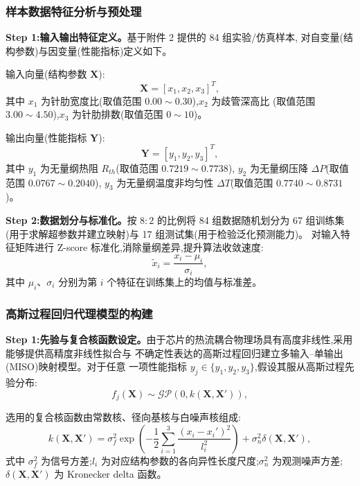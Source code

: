 \subsubsection{样本数据特征分析与预处理}

\textbf{Step 1:输入输出特征定义。}基于附件 2 提供的 84 组实验/仿真样本,
对自变量(结构参数)与因变量(性能指标)定义如下。

输入向量(结构参数 $\mathbf{X}$):
\begin{equation}
  \mathbf{X} = [x_1, x_2, x_3]^T,
  \label{eq:input-vector}
\end{equation}
其中 $x_1$ 为针肋宽度比(取值范围 $0.00 \sim 0.30$),$x_2$ 为歧管深高比
(取值范围 $3.00 \sim 4.50$),$x_3$ 为针肋排数(取值范围 $0 \sim 10$)。

输出向量(性能指标 $\mathbf{Y}$):
\begin{equation}
  \mathbf{Y} = [y_1, y_2, y_3]^T,
  \label{eq:output-vector}
\end{equation}
其中 $y_1$ 为无量纲热阻 $R_{th}$(取值范围 $0.7219 \sim 0.7738$),
$y_2$ 为无量纲压降 $\Delta P$(取值范围 $0.0767 \sim 0.2040$),
$y_3$ 为无量纲温度非均匀性 $\Delta T$(取值范围 $0.7740 \sim 0.8731$)。

\textbf{Step 2:数据划分与标准化。}按 $8:2$ 的比例将 84 组数据随机划分为 67 组训练集
(用于求解超参数并建立映射)与 17 组测试集(用于检验泛化预测能力)。
对输入特征矩阵进行 Z-score 标准化,消除量纲差异,提升算法收敛速度:
\begin{equation}
  \tilde{x}_i = \frac{x_i - \mu_i}{\sigma_i},
  \label{eq:standardize}
\end{equation}
其中 $\mu_i$、$\sigma_i$ 分别为第 $i$ 个特征在训练集上的均值与标准差。

\subsubsection{高斯过程回归代理模型的构建}

\textbf{Step 1:先验与复合核函数设定。}由于芯片的热流耦合物理场具有高度非线性,采用能够提供高精度非线性拟合与
不确定性表达的高斯过程回归\cite{Rasmussen2006}建立多输入--单输出(MISO)映射模型。对于任意
一项性能指标 $y_j \in \{y_1, y_2, y_3\}$,假设其服从高斯过程先验分布:
\begin{equation}
  f_j(\mathbf{X}) \sim \mathcal{GP}\left(0, k(\mathbf{X}, \mathbf{X}')\right),
  \label{eq:gp-prior}
\end{equation}

选用的复合核函数由常数核、径向基核与白噪声核组成:
\begin{equation}
  k(\mathbf{X}, \mathbf{X}') = \sigma_f^2 \exp\left( -\frac{1}{2}
  \sum_{i=1}^{3} \frac{(x_i - x_i')^2}{l_i^2} \right) + \sigma_n^2
  \delta(\mathbf{X}, \mathbf{X}'),
  \label{eq:kernel}
\end{equation}
式中 $\sigma_f^2$ 为信号方差;$l_i$ 为对应结构参数的各向异性长度尺度;$\sigma_n^2$ 为观测噪声方差;$\delta(\mathbf{X},
  \mathbf{X}')$ 为 Kronecker delta 函数。

